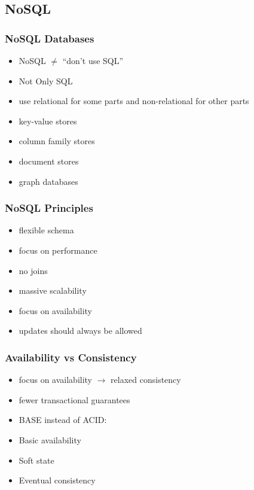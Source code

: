 \documentclass[dvipsnames]{beamer}
\theoremstyle{plain}
\begin{document}
\subsection{NoSQL}

\begin{frame}
  \frametitle{NoSQL Databases}

  \begin{itemize}
    \item NoSQL $\neq$ ``don't use SQL''
    \item Not Only SQL
    \item use relational for some parts and non-relational for other parts

    \pause
    \medskip
    \item key-value stores
    \item column family stores
    \item document stores
    \item graph databases
  \end{itemize}
\end{frame}

\begin{frame}
  \frametitle{NoSQL Principles}

  \begin{itemize}
    \item flexible schema

    \pause
    \medskip
    \item focus on performance
    \item no joins

    \pause
    \medskip
    \item massive scalability

    \pause
    \medskip
    \item focus on availability
    \item updates should always be allowed
  \end{itemize}
\end{frame}

\begin{frame}
  \frametitle{Availability vs Consistency}

  \begin{itemize}
    \item focus on availability $\rightarrow$ relaxed consistency
    \item fewer transactional guarantees

    \bigskip
    \item \alert{BASE} instead of ACID:
    \smallskip
    \item Basic availability
    \item Soft state
    \item Eventual consistency
  \end{itemize}
\end{frame}
\end{document}
